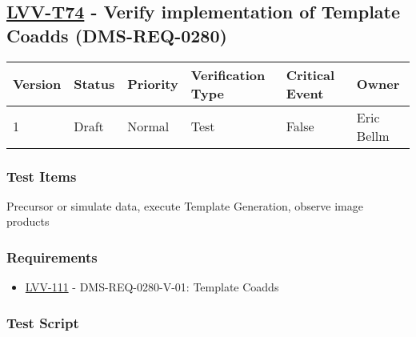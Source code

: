 \hypertarget{lvv-t74---verify-implementation-of-template-coadds-dms-req-0280}{%
\subsection{\texorpdfstring{\href{https://jira.lsstcorp.org/secure/Tests.jspa\#/testCase/LVV-T74}{LVV-T74}
- Verify implementation of Template Coadds
(DMS-REQ-0280)}{LVV-T74 - Verify implementation of Template Coadds (DMS-REQ-0280)}}\label{lvv-t74---verify-implementation-of-template-coadds-dms-req-0280}}

\begin{longtable}[]{@{}llllll@{}}
\toprule
Version & Status & Priority & Verification Type & Critical Event &
Owner\tabularnewline
\midrule
\endhead
1 & Draft & Normal & Test & False & Eric Bellm\tabularnewline
\bottomrule
\end{longtable}

\hypertarget{test-items-163}{%
\subsubsection{Test Items}\label{test-items-163}}

Precursor or simulate data, execute Template Generation, observe image
products

\hypertarget{requirements-164}{%
\subsubsection{Requirements}\label{requirements-164}}

\begin{itemize}
\tightlist
\item
  \href{https://jira.lsstcorp.org/browse/LVV-111}{LVV-111} -
  DMS-REQ-0280-V-01: Template Coadds
\end{itemize}

\hypertarget{test-script-164}{%
\subsubsection{Test Script}\label{test-script-164}}

